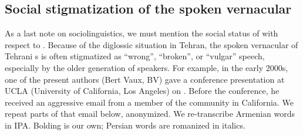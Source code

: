 \subsection{Social stigmatization of the spoken vernacular}\label{section: intro: socio: stigma}
As a last note on   sociolinguistics,  we must mention the social status of {\iaIA} with respect to {\seaSEA}. Because of the  diglossic situation in Tehran, the spoken vernacular of Tehrani {\iaIA}s   is often stigmatized as  ``wrong'', ``broken'', or  ``vulgar'' speech, especially by the older generation of speakers. For example, in the early 2000s, one of the present authors (Bert Vaux, BV)    gave a conference presentation at UCLA (University of California, Los Angeles) on  {\iaIA}. Before the conference, he received an aggressive email from a member of the {\iaIA} community in California. We repeat  parts of that email below, anonymized. We re-transcribe  Armenian words in IPA. Bolding is our own; Persian words are romanized in italics.   

